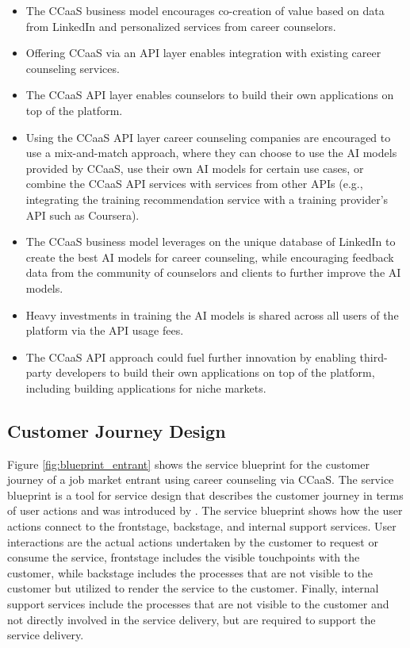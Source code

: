 \begin{itemize}
    \item The CCaaS business model encourages co-creation of value based on data from LinkedIn and
        personalized services from career counselors.
    \item Offering CCaaS via an API layer enables integration with existing career counseling services.
    \item The CCaaS API layer enables counselors to build their own applications on top of the platform.
    \item Using the CCaaS API layer career counseling companies are encouraged to use a mix-and-match approach,
        where they can choose to use the AI models provided by CCaaS, use their own AI models for certain 
        use cases, or combine the CCaaS API services with services from other APIs (e.g., integrating 
        the training recommendation service with a training provider's API such as Coursera).
    \item The CCaaS business model leverages on the unique database of LinkedIn to create the best AI
        models for career counseling, while encouraging feedback data from the community of counselors
        and clients to further improve the AI models.
    \item Heavy investments in training the AI models is shared across all users of the platform
        via the API usage fees.
    \item The CCaaS API approach could fuel further innovation by enabling third-party developers to
        build their own applications on top of the platform, including building applications for 
        niche markets.
\end{itemize}

\subsection{Customer Journey Design}

Figure \ref{fig:blueprint_entrant} shows the service blueprint for the customer journey of a job
market entrant using career counseling via CCaaS. The service blueprint is a tool for service design
that describes the customer journey in terms of user actions and was introduced by \citet{shostackDesigningServicesThat1984}.
The service blueprint shows how the user actions connect to the frontstage, backstage, and internal
support services. User interactions are the actual actions undertaken by the customer to request or
consume the service, frontstage includes the visible touchpoints with the customer, while backstage
includes the processes that are not visible to the customer but utilized to render the service to the
customer. Finally, internal support services include the processes that are not visible to the customer
and not directly involved in the service delivery, but are required to support the service delivery.

